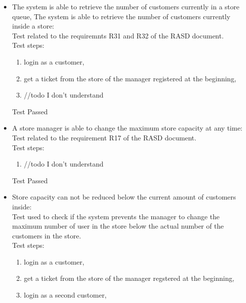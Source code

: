 \begin{itemize}

    \item The system is able to retrieve the number of customers currently in a store queue, The system is able to retrieve the number of customers currently inside a store: \\
    Test related to the requiremnts R31 and R32 of the RASD document. \\
    Test steps: \\
    \begin{enumerate}
        \item login as a customer,

        \item get a ticket from the store of the manager registered at the beginning,

        \item //todo I don't understand
    \end{enumerate}
    Test Passed \\

    \item A store manager is able to change the maximum store capacity at any time: \\
    Test related to the requirement R17 of the RASD document. \\
    Test steps: \\
    \begin{enumerate}
        \item //todo I don't understand
    \end{enumerate}
    Test Passed \\

    \item Store capacity can not be reduced below the current amount of customers inside: \\
    Test used to check if the system prevents the manager to change the maximum number of user in the store below the actual number of the customers in the store.\\
    Test steps:\\
    \begin{enumerate}
        \item login as a customer,

        \item get a ticket from the store of the manager regstered at the beginning,

        \item login as a second customer,


\end{enumerate}
\end{itemize}
